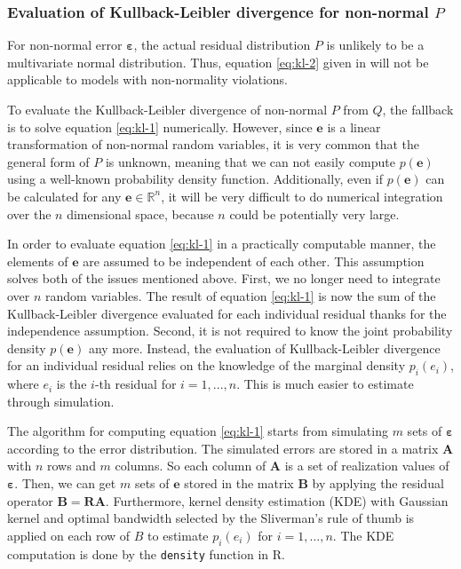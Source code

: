\documentclass[]{interact}
\theoremstyle{plain}%
\theoremstyle{definition}
\theoremstyle{remark}
\begin{document}
\hypertarget{evaluation-of-kullback-leibler-divergence-for-non-normal-p}{%
\subsubsection{\texorpdfstring{Evaluation of Kullback-Leibler divergence
for non-normal
\(P\)}{Evaluation of Kullback-Leibler divergence for non-normal P}}\label{evaluation-of-kullback-leibler-divergence-for-non-normal-p}}

For non-normal error \(\boldsymbol{\varepsilon}\), the actual residual
distribution \(P\) is unlikely to be a multivariate normal distribution.
Thus, equation \ref{eq:kl-2} given in \citet{li2023plot} will not be
applicable to models with non-normality violations.

To evaluate the Kullback-Leibler divergence of non-normal \(P\) from
\(Q\), the fallback is to solve equation \ref{eq:kl-1} numerically.
However, since \(\boldsymbol{e}\) is a linear transformation of
non-normal random variables, it is very common that the general form of
\(P\) is unknown, meaning that we can not easily compute
\(p(\boldsymbol{e})\) using a well-known probability density function.
Additionally, even if \(p(\boldsymbol{e})\) can be calculated for any
\(\boldsymbol{e} \in \mathbb{R}^n\), it will be very difficult to do
numerical integration over the \(n\) dimensional space, because \(n\)
could be potentially very large.

In order to evaluate equation \ref{eq:kl-1} in a practically computable
manner, the elements of \(\boldsymbol{e}\) are assumed to be independent
of each other. This assumption solves both of the issues mentioned
above. First, we no longer need to integrate over \(n\) random
variables. The result of equation \ref{eq:kl-1} is now the sum of the
Kullback-Leibler divergence evaluated for each individual residual
thanks for the independence assumption. Second, it is not required to
know the joint probability density \(p(\boldsymbol{e})\) any more.
Instead, the evaluation of Kullback-Leibler divergence for an individual
residual relies on the knowledge of the marginal density \(p_i(e_i)\),
where \(e_i\) is the \(i\)-th residual for \(i = 1, ..., n\). This is
much easier to estimate through simulation.

The algorithm for computing equation \ref{eq:kl-1} starts from
simulating \(m\) sets of \(\boldsymbol{\varepsilon}\) according to the
error distribution. The simulated errors are stored in a matrix
\(\boldsymbol{A}\) with \(n\) rows and \(m\) columns. So each column of
\(\boldsymbol{A}\) is a set of realization values of
\(\boldsymbol{\varepsilon}\). Then, we can get \(m\) sets of
\(\boldsymbol{e}\) stored in the matrix \(\boldsymbol{B}\) by applying
the residual operator \(\boldsymbol{B} = \boldsymbol{R}\boldsymbol{A}\).
Furthermore, kernel density estimation (KDE) with Gaussian kernel and
optimal bandwidth selected by the Sliverman's rule of thumb
\citep{silverman2018density} is applied on each row of \(B\) to estimate
\(p_i(e_i)\) for \(i = 1, ..., n\). The KDE computation is done by the
\texttt{density} function in R.
\end{document}
